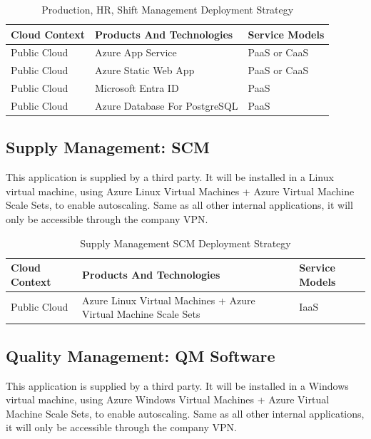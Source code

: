 \documentclass{llncs}
\begin{document}
\begin{table}[h!]
    \centering
    \begin{tabular}{lll}
        \hline
        \textbf{Cloud Context} & \textbf{Products And Technologies} & \textbf{Service Models} \\
        \hline
        Public Cloud           & Azure App Service                  & PaaS or CaaS            \\
        \hline
        Public Cloud           & Azure Static Web App               & PaaS or CaaS            \\

        \hline
        Public Cloud           & Microsoft Entra ID                 & PaaS                    \\
        \hline
        Public Cloud           & Azure Database For PostgreSQL      & PaaS                    \\
        \hline
    \end{tabular}
    \caption{Production, HR, Shift Management Deployment Strategy}
\end{table}

\subsection{Supply Management: SCM}
This application is supplied by a third party. It will be installed in a Linux virtual machine, using Azure Linux Virtual Machines + Azure Virtual Machine Scale Sets, to enable autoscaling.
Same as all other internal applications, it will only be accessible through the company VPN.\\

\begin{table}[h!]
    \centering
    \begin{tabular}{lll}
        \hline
        \textbf{Cloud Context} & \textbf{Products And Technologies}                              & \textbf{Service Models} \\
        \hline
        Public Cloud           & Azure Linux Virtual Machines + Azure Virtual Machine Scale Sets & IaaS                    \\
    \end{tabular}
    \caption{Supply Management SCM Deployment Strategy}
\end{table}

\subsection{Quality Management: QM Software}
This application is supplied by a third party. It will be installed in a Windows virtual machine, using Azure Windows Virtual Machines + Azure Virtual Machine Scale Sets, to enable autoscaling.
Same as all other internal applications, it will only be accessible through the company VPN.\\
\end{document}
